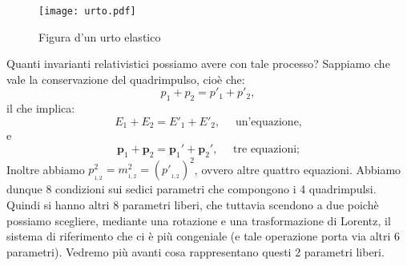\begin{figure}[htbp]
\begin{center}
\texttt{[image: urto.pdf]}
\caption{Figura d'un urto elastico} \label{fig:urto}
\end{center}
\end{figure}

Quanti invarianti relativistici possiamo avere con tale processo?
Sappiamo che vale la conservazione del quadrimpulso, cio\`e che:
$$
p_1+p_2=p'_1+p'_2,
$$
il che implica:
$$
E_1+E_2=E'_1+E'_2, \quad\mbox{ un'equazione,}
$$
e
$$
\mathbf{p}_1+\mathbf{p}_2=\mathbf{p}_1{}'+\mathbf{p}_2{}',
\quad\mbox{ tre equazioni;}
$$
Inoltre abbiamo
$p_{{}_{1,2}}^2=m_{{}_{1,2}}^2=(p'_{{}_{1,2}}{})^2$, ovvero altre
quattro equazioni. Abbiamo dunque 8 condizioni sui sedici
parametri che compongono i 4 quadrimpulsi. Quindi si hanno altri 8
parametri liberi, che tuttavia scendono a due poich\`e possiamo
scegliere, mediante una rotazione e una trasformazione di Lorentz,
il sistema di riferimento che ci \`e pi\`u congeniale (e tale
operazione porta via altri 6 parametri). Vedremo pi\`u avanti cosa
rappresentano questi 2 parametri liberi.
